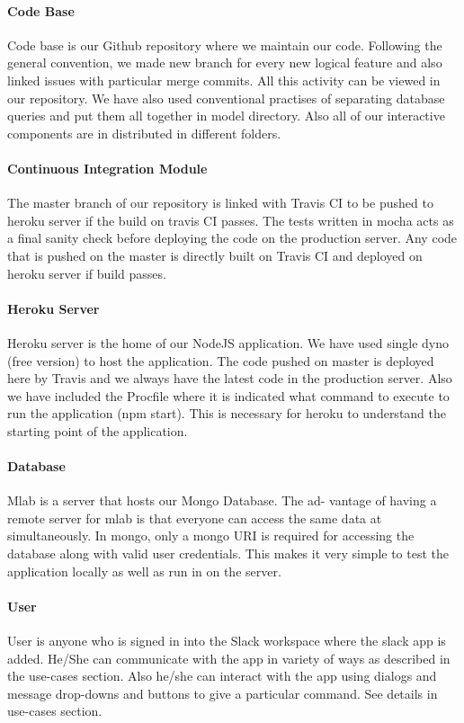 \paragraph{Code Base}
Code base is our Github repository where we maintain our code. Following the general convention, we made new branch for every new logical feature and also linked issues with particular merge commits. All this activity can be viewed in our repository. We have also used conventional practises of separating database queries and put them all together in model directory. Also all of our interactive components are in distributed in different folders.

\paragraph{Continuous Integration Module}
The master branch of our repository is linked with Travis CI to be pushed to heroku server if the build on travis CI passes. The tests written in mocha acts as a final sanity check before deploying the code on the production server. Any code that is pushed on the master is directly built on Travis CI and deployed on heroku server if build passes.

\paragraph{Heroku Server}
Heroku server is the home of our NodeJS application. We have used single dyno (free version) to host the application. The code pushed on master is deployed here by Travis and we always have the latest code in the production server. Also we have included the Procfile where it is indicated what command to execute to run the application (npm start). This is necessary for heroku to understand the starting point of the application.

\paragraph{Database}
Mlab is a server that hosts our Mongo Database. The ad- vantage of having a remote server for mlab is that everyone can access the same data at simultaneously. In mongo, only a mongo URI is required for accessing the database along with valid user credentials. This makes it very simple to test the application locally as well as run in on the server.

\paragraph{User}
User is anyone who is signed in into the Slack workspace where the slack app is added. He/She can communicate with the app in variety of ways as described in the use-cases section. Also he/she can interact with the app using dialogs and message drop-downs and buttons to give a particular command. See details in use-cases section.

